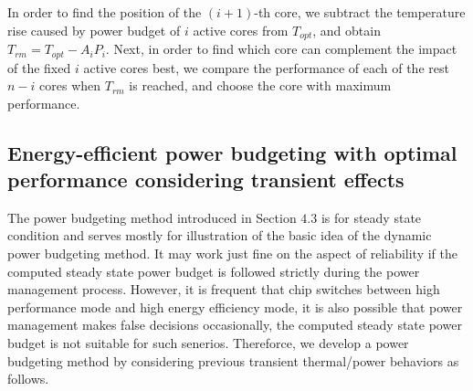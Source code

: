 In order to find the position of the $(i+1)$-th core, we subtract the
temperature rise caused by power budget of $i$ active cores from $T_{opt}$,
and obtain $T_{rm}=T_{opt}-A_iP_i$. Next, in order to find which core can complement the impact of the fixed $i$ active cores best, we compare the performance of each of the rest $n-i$ cores when $T_{rm}$ is reached, and choose the core with maximum performance.







\subsection{Energy-efficient power budgeting with optimal performance considering transient effects}
The power budgeting method introduced in Section $4.3$ is for steady state condition and serves mostly for illustration of the basic idea of the dynamic power budgeting method. It may work just fine on the aspect of reliability if the computed steady state power budget is followed strictly during the power management process. However, it is frequent that chip switches between high performance mode and high energy efficiency mode, it is also possible that power management makes false decisions occasionally, the computed steady state power budget is not suitable for such senerios. Thereforce, we develop a power budgeting method by considering previous transient thermal/power behaviors as follows.

